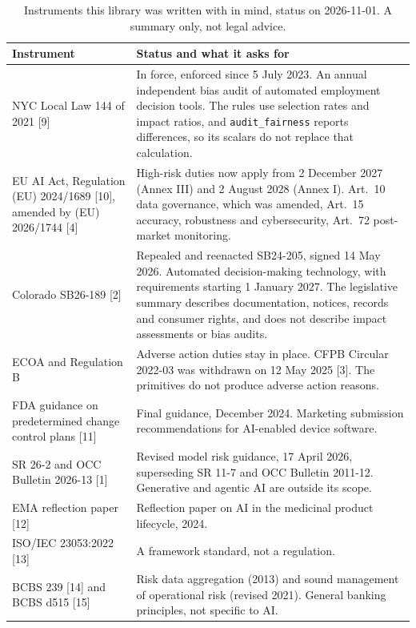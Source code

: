 \documentclass[10pt,a4paper]{article}
\begin{document}
\begin{table}[h]
\small
\caption{Instruments this library was written with in mind, status on 2026-11-01. A summary only, not legal advice.}
\begin{tabularx}{\textwidth}{>{\raggedright\arraybackslash}p{4.2cm} Y}
\toprule
\textbf{Instrument} & \textbf{Status and what it asks for} \\
\midrule
NYC Local Law 144 of 2021 [9] & In force, enforced since 5 July 2023. An annual independent bias audit of automated employment decision tools. The rules use selection rates and impact ratios, and \texttt{audit\_fairness} reports differences, so its scalars do not replace that calculation. \\
EU AI Act, Regulation (EU) 2024/1689 [10], amended by (EU) 2026/1744 [4] & High-risk duties now apply from 2 December 2027 (Annex III) and 2 August 2028 (Annex I). Art.\ 10 data governance, which was amended, Art.\ 15 accuracy, robustness and cybersecurity, Art.\ 72 post-market monitoring. \\
Colorado SB26-189 [2] & Repealed and reenacted SB24-205, signed 14 May 2026. Automated decision-making technology, with requirements starting 1 January 2027. The legislative summary describes documentation, notices, records and consumer rights, and does not describe impact assessments or bias audits. \\
ECOA and Regulation B & Adverse action duties stay in place. CFPB Circular 2022-03 was withdrawn on 12 May 2025 [3]. The primitives do not produce adverse action reasons. \\
FDA guidance on predetermined change control plans [11] & Final guidance, December 2024. Marketing submission recommendations for AI-enabled device software. \\
SR 26-2 and OCC Bulletin 2026-13 [1] & Revised model risk guidance, 17 April 2026, superseding SR 11-7 and OCC Bulletin 2011-12. Generative and agentic AI are outside its scope. \\
EMA reflection paper [12] & Reflection paper on AI in the medicinal product lifecycle, 2024. \\
ISO/IEC 23053:2022 [13] & A framework standard, not a regulation. \\
BCBS 239 [14] and BCBS d515 [15] & Risk data aggregation (2013) and sound management of operational risk (revised 2021). General banking principles, not specific to AI. \\
\bottomrule
\end{tabularx}
\end{table}
\end{document}
